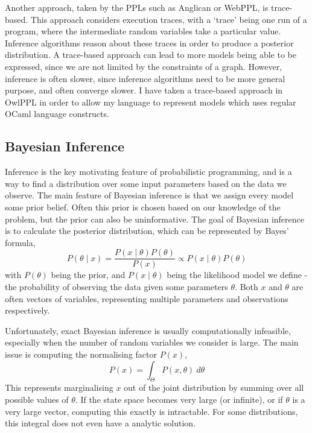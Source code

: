 Another approach, taken by the PPLs such as Anglican or WebPPL, is trace-based. This approach considers execution traces, with a `trace' being one run of a program, where the intermediate random variables take a particular value. Inference algorithms reason about these traces in order to produce a posterior distribution. A trace-based approach can lead to more models being able to be expressed, since we are not limited by the constraints of a graph. However, inference is often slower, since inference algorithms need to be more general purpose, and often converge slower. I have taken a trace-based approach in OwlPPL in order to allow my language to represent models which uses regular OCaml language constructs.
		
\subsection{Bayesian Inference}
Inference is the key motivating feature of probabilistic programming, and is a way to find a distribution over some input parameters based on the data we observe. The main feature of Bayesian inference is that we assign every model some prior belief. Often this prior is chosen based on our knowledge of the problem, but the prior can also be uninformative. The goal of Bayesian inference is to calculate the posterior distribution, which can be represented by Bayes' formula,
% 
\[P(\theta\mid x)=\frac{P(x\mid\theta)P(\theta)}{P(x)}\propto{{P(x\mid\theta)P(\theta)}} \]
% 
with $P(\theta)$ being the prior, and $P(x\mid \theta)$ being the likelihood model we define - the probability of observing the data given some parameters $\theta$. Both $x$ and $\theta$ are often vectors of variables, representing multiple parameters and observations respectively.
	
Unfortunately, exact Bayesian inference is usually computationally infeasible, especially when the number of random variables  we consider is large. The main issue is computing the normalising factor $P(x)$,
\[P(x)=\int_{\Theta}P(x,\theta)~d\theta\]
This represents marginalising $x$ out of the joint distribution by summing over all possible values of $\theta$. If the state space becomes very large (or infinite), or if $\theta$ is a very large vector, computing this exactly is intractable. For some distributions, this integral does not even have a analytic solution.


